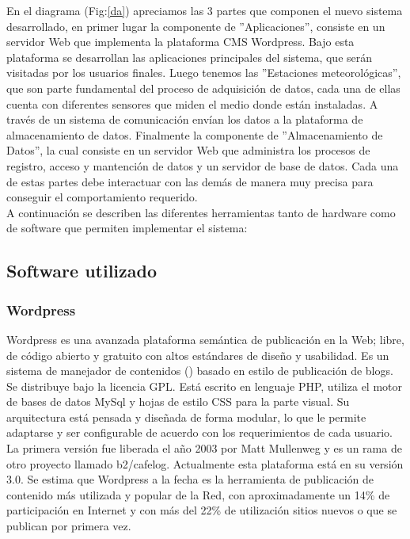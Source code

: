 En el diagrama (Fig:\ref{da}) apreciamos las 3 partes que componen el nuevo sistema desarrollado, en primer lugar la componente de ''Aplicaciones'', consiste en un servidor Web que implementa la plataforma CMS Wordpress. Bajo esta plataforma se desarrollan las aplicaciones principales del sistema, que serán visitadas por los usuarios finales. Luego tenemos las ''Estaciones meteorológicas'', que son parte fundamental del proceso de adquisición de datos, cada una de ellas cuenta con diferentes sensores que miden el medio donde están instaladas. A través de un sistema de comunicación envían los datos a la plataforma de almacenamiento de datos. Finalmente la componente de ''Almacenamiento de Datos'', la cual consiste en un servidor Web que administra los procesos de registro, acceso y mantención de datos y un servidor de base de datos. Cada una de estas partes debe interactuar con las demás de manera muy precisa para conseguir el comportamiento requerido.\\

A continuación se describen las diferentes herramientas tanto de hardware como de software que permiten implementar el sistema:

\subsection{Software utilizado}
\subsubsection{Wordpress}
Wordpress es una avanzada plataforma semántica de publicación en la Web; libre, de código abierto y gratuito con altos estándares de diseño y usabilidad. Es un sistema de manejador de contenidos () basado en estilo de publicación de blogs. Se distribuye bajo la licencia GPL. Está escrito en lenguaje PHP, utiliza el motor de bases de datos MySql y hojas de estilo CSS para la parte visual. Su arquitectura está pensada y diseñada de forma modular, lo que le permite adaptarse y ser configurable de acuerdo con los requerimientos de cada usuario.\\

La primera versión fue liberada el año 2003 por Matt Mullenweg y es un rama de otro proyecto llamado b2/cafelog. Actualmente esta plataforma está en su versión 3.0. Se estima que Wordpress a la fecha es la herramienta de publicación de contenido más utilizada y popular de la Red, con aproximadamente un 14\% de participación en Internet y con más del 22\% de utilización sitios nuevos o que se publican por primera vez\cite{software:usoWordpress}.

